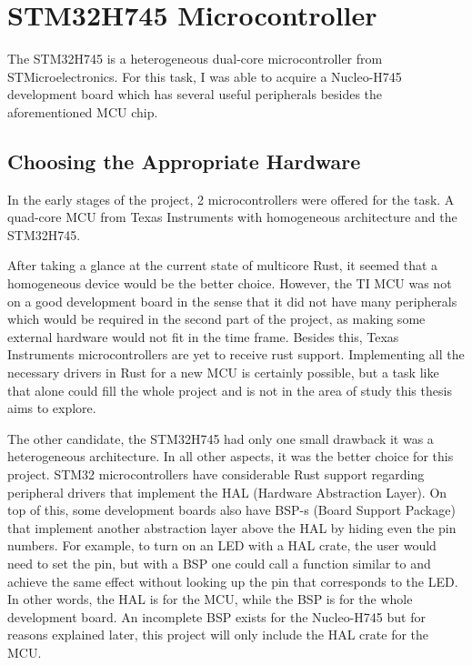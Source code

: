 \chapter{STM32H745 Microcontroller}

The STM32H745 is a heterogeneous dual-core microcontroller from STMicroelectronics. For this task, I was able to acquire a Nucleo-H745 development board which has several useful peripherals besides the aforementioned MCU chip.

\section{Choosing the Appropriate Hardware}

In the early stages of the project, 2 microcontrollers were offered for the task. A quad-core MCU from Texas Instruments with homogeneous architecture and the STM32H745.

After taking a glance at the current state of multicore Rust, it seemed that a homogeneous device would be the better choice. However, the TI MCU was not on a good development board in the sense that it did not have many peripherals which would be required in the second part of the project, as making some external hardware would not fit in the time frame. Besides this, Texas Instruments microcontrollers are yet to receive rust support. Implementing all the necessary drivers in Rust for a new MCU is certainly possible, but a task like that alone could fill the whole project and is not in the area of study this thesis aims to explore.

The other candidate, the STM32H745 had only one small drawback it was a heterogeneous architecture. In all other aspects, it was the better choice for this project. STM32 microcontrollers have considerable Rust support regarding peripheral drivers that implement the HAL (Hardware Abstraction Layer). On top of this, some development boards also have BSP-s (Board Support Package) that implement another abstraction layer above the HAL by hiding even the pin numbers. For example, to turn on an LED with a HAL crate, the user would need to set the  pin, but with a BSP one could call a function similar to  and achieve the same effect without looking up the pin that corresponds to the LED. In other words, the HAL is for the MCU, while the BSP is for the whole development board. An incomplete BSP exists for the Nucleo-H745 but for reasons explained later, this project will only include the HAL crate for the MCU.


